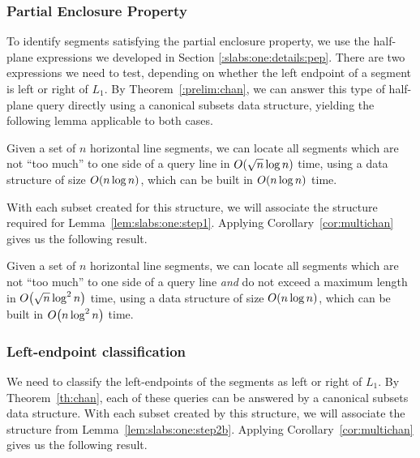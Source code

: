 \subsubsection{Partial Enclosure Property}

To identify segments satisfying the partial enclosure property, we use the half-plane expressions we developed in Section \ref{:slabs:one:details:pep}.
There are two expressions we need to test, depending on whether the left endpoint of a segment is left or right of $L_1$.
By Theorem~\ref{:prelim:chan}, we can answer this type of half-plane query directly using a canonical subsets data structure, yielding the following lemma applicable to both cases.

\begin{lemma}
\label{lem:slabs:one:step2a}
Given a set of $n$ horizontal line segments, we can locate all segments which are not ``too much'' to one side of a query line in $O\!\left(\sqrt{n}\log{n}\right)$ time, using a data structure of size $O\!\left(n\log{n}\right)$, which can be built in $O\!\left(n\log{n}\right)$ time.
\end{lemma}

With each subset created for this structure, we will associate the structure required for Lemma~\ref{lem:slabs:one:step1}.
Applying Corollary~\ref{cor:multichan} gives us the following result.

\begin{lemma}
\label{lem:slabs:one:step2b}
Given a set of $n$ horizontal line segments, we can locate all segments which are not ``too much'' to one side of a query line \emph{and} do not exceed a maximum length in $O\!\left(\sqrt{n}\log^2{n}\right)$ time, using a data structure of size $O\!\left(n\log{n}\right)$, which can be built in $O\!\left(n\log^2{n}\right)$ time.
\end{lemma}


\subsubsection{Left-endpoint classification}

We need to classify the left-endpoints of the segments as left or right of $L_1$. 
By Theorem~\ref{th:chan}, each of these queries can be answered by a canonical subsets data structure.
With each subset created by this structure, we will associate the structure from Lemma~\ref{lem:slabs:one:step2b}. 
Applying Corollary~\ref{cor:multichan} gives us the following result.

